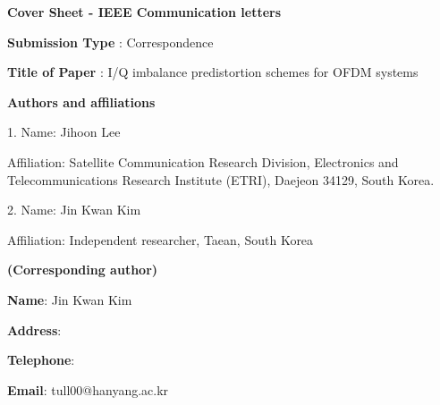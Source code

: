 \documentclass[draftcls,12pt,onecolumn]{IEEEtran}
\begin{document}
\begin{center}
\textbf{Cover Sheet - IEEE Communication letters}
\end{center}

\textbf{Submission Type} : Correspondence
\vspace{5mm}

\textbf{Title of Paper} : I/Q imbalance predistortion schemes for OFDM systems
\vspace{5mm}

\textbf{Authors and affiliations}

1. Name: Jihoon Lee

Affiliation: Satellite Communication Research Division, Electronics and Telecommunications Research Institute (ETRI), Daejeon 34129, South Korea.

2. Name: Jin Kwan Kim

Affiliation: Independent researcher, Taean, South Korea

\vspace{5mm}
\textbf{(Corresponding author)}

\textbf{Name}: Jin Kwan Kim

\textbf{Address}: 

\textbf{Telephone}: 

\textbf{Email}: tull00@hanyang.ac.kr
\end{document}
